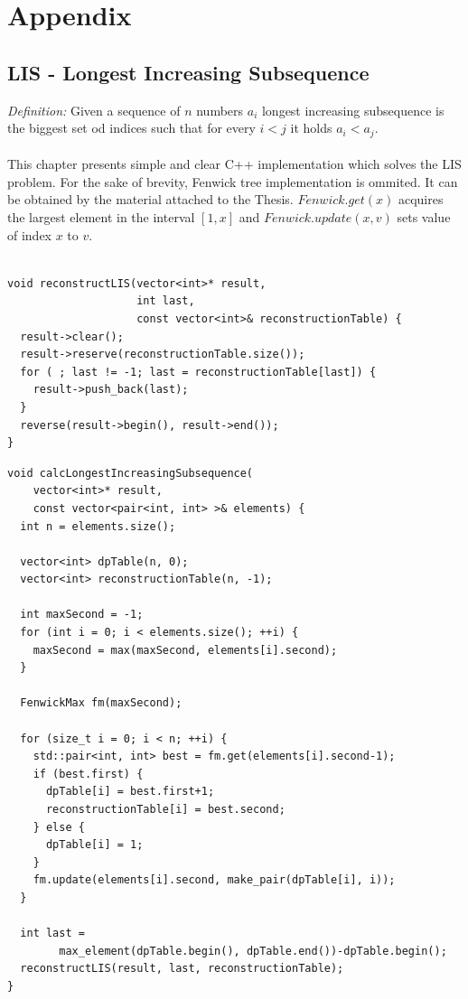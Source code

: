\documentclass[times, utf8, diplomski]{fer}
\begin{document}
\chapter{Appendix}

\section{LIS - Longest Increasing Subsequence\cite{Fredman197529}}
\emph{Definition:} Given a sequence of $n$ numbers $a_i$ longest increasing subsequence is the biggest set od indices such that for every $i < j$ it holds $a_i < a_j$.\\
\\
This chapter presents simple and clear C++ implementation which solves the LIS problem. For the sake of brevity, Fenwick tree implementation is ommited. It can be obtained by the material attached to the Thesis. $Fenwick.get(x)$ acquires the largest element in the interval $[1,x]$ and $Fenwick.update(x, v)$ sets value of index $x$ to $v$.


\begin{algorithm}[H]
\begin{lstlisting}

void reconstructLIS(vector<int>* result,
                    int last,
                    const vector<int>& reconstructionTable) {
  result->clear();
  result->reserve(reconstructionTable.size());
  for ( ; last != -1; last = reconstructionTable[last]) {
    result->push_back(last);
  }
  reverse(result->begin(), result->end());
}

\end{lstlisting}
\end{algorithm}


\begin{algorithm}[H]
\begin{lstlisting}
void calcLongestIncreasingSubsequence(
    vector<int>* result,
    const vector<pair<int, int> >& elements) {
  int n = elements.size();

  vector<int> dpTable(n, 0);
  vector<int> reconstructionTable(n, -1);

  int maxSecond = -1;
  for (int i = 0; i < elements.size(); ++i) {
    maxSecond = max(maxSecond, elements[i].second);
  }

  FenwickMax fm(maxSecond);

  for (size_t i = 0; i < n; ++i) {
    std::pair<int, int> best = fm.get(elements[i].second-1);
    if (best.first) {
      dpTable[i] = best.first+1;
      reconstructionTable[i] = best.second;
    } else {
      dpTable[i] = 1;
    }
    fm.update(elements[i].second, make_pair(dpTable[i], i));
  }

  int last = 
        max_element(dpTable.begin(), dpTable.end())-dpTable.begin();
  reconstructLIS(result, last, reconstructionTable);
}
\end{lstlisting}
\end{algorithm}
\end{document}
